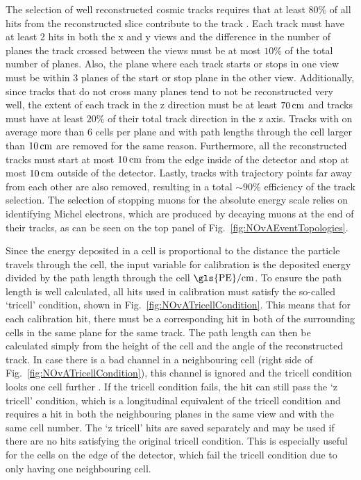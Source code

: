 The selection of well reconstructed cosmic tracks requires that at least $80\%$ of all hits from the reconstructed slice contribute to the track \cite{NOvA-doc-13579-FACalorimetricEnergyScale}. Each track must have at least 2 hits in both the x and y views and the difference in the number of planes the track crossed between the views must be at most $10\%$ of the total number of planes. Also, the plane where each track starts or stops in one view must be within 3 planes of the start or stop plane in the other view. Additionally, since tracks that do not cross many planes tend to not be reconstructed very well, the extent of each track in the z direction must be at least $\unit[70]{cm}$ and tracks must have at least $20\%$ of their total track direction in the z axis. Tracks with on average more than 6 cells per plane and with path lengths through the cell larger than $\unit[10]{cm}$ are removed for the same reason. Furthermore, all the reconstructed tracks must start at most $\unit[10]{cm}$ from the edge inside of the detector and stop at most $\unit[10]{cm}$ outside of the detector. Lastly, tracks with trajectory points far away from each other are also removed, resulting in a total $\sim 90\%$ efficiency of the track selection. The selection of stopping muons for the absolute energy scale relies on identifying Michel electrons, which are produced by decaying muons at the end of their tracks, as can be seen on the top panel of Fig.~\ref{fig:NOvAEventTopologies}.

Since the energy deposited in a cell is proportional to the distance the particle travels through the cell, the input variable for calibration is the deposited energy divided by the path length through the cell $\unit{\gls{PE}/cm}$. To ensure the path length is well calculated, all hits used in calibration must satisfy the so-called `tricell' condition, shown in Fig.~\ref{fig:NOvATricellCondition}. This means that for each calibration hit, there must be a corresponding hit in both of the surrounding cells in the same plane for the same track. The path length can then be calculated simply from the height of the cell and the angle of the reconstructed track. In case there is a bad channel in a neighbouring cell (right side of Fig.~\ref{fig:NOvATricellCondition}), this channel is ignored and the tricell condition looks one cell further \cite{PrabhjotNOvAThesis_CalibrationAndOscResults2019.pdf}. If the tricell condition fails, the hit can still pass the `z tricell' condition, which is a longitudinal equivalent of the tricell condition and requires a hit in both the neighbouring planes in the same view and with the same cell number. The `z tricell' hits are saved separately and may be used if there are no hits satisfying the original tricell condition. This is especially useful for the cells on the edge of the detector, which fail the tricell condition due to only having one neighbouring cell.


